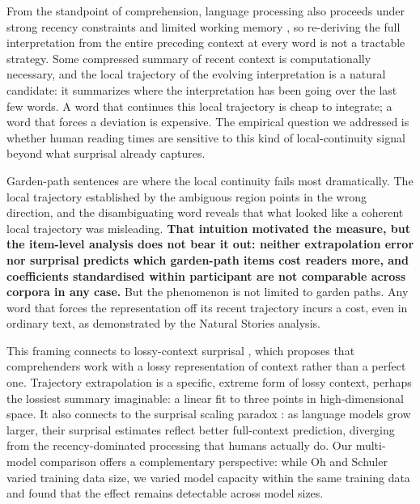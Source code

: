 \documentclass[12pt]{article}
\newcommand{\new}[1]{{\bfseries #1}}
\begin{document}
From the standpoint of comprehension, language processing also proceeds under strong recency constraints and limited working memory \citep{gibson1998,lewis2005}, so re-deriving the full interpretation from the entire preceding context at every word is not a tractable strategy. Some compressed summary of recent context is computationally necessary, and the local trajectory of the evolving interpretation is a natural candidate: it summarizes where the interpretation has been going over the last few words. A word that continues this local trajectory is cheap to integrate; a word that forces a deviation is expensive. The empirical question we addressed is whether human reading times are sensitive to this kind of local-continuity signal beyond what surprisal already captures.

Garden-path sentences are where the local continuity fails most dramatically. The local trajectory established by the ambiguous region points in the wrong direction, and the disambiguating word reveals that what looked like a coherent local trajectory was misleading. \new{That intuition motivated the measure, but the item-level analysis does not bear it out: neither extrapolation error nor surprisal predicts which garden-path items cost readers more, and coefficients standardised within participant are not comparable across corpora in any case.} But the phenomenon is not limited to garden paths. Any word that forces the representation off its recent trajectory incurs a cost, even in ordinary text, as demonstrated by the Natural Stories analysis.

This framing connects to lossy-context surprisal \citep{futrell2020}, which proposes that comprehenders work with a lossy representation of context rather than a perfect one. Trajectory extrapolation is a specific, extreme form of lossy context, perhaps the lossiest summary imaginable: a linear fit to three points in high-dimensional space. It also connects to the surprisal scaling paradox \citep{oh2023b}: as language models grow larger, their surprisal estimates reflect better full-context prediction, diverging from the recency-dominated processing that humans actually do. Our multi-model comparison offers a complementary perspective: while Oh and Schuler varied training data size, we varied model capacity within the same training data and found that the effect remains detectable across model sizes.
\end{document}
